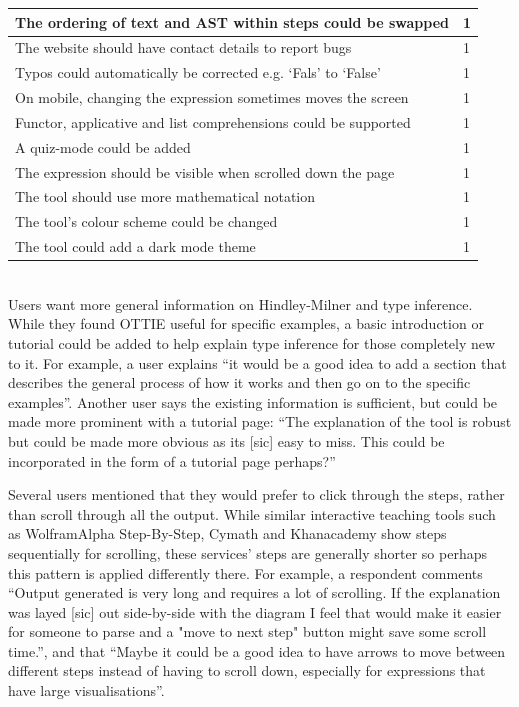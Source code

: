 \documentclass[a4paper,fleqn,oneside,12pt]{report}
\begin{document}
\begin{adjustbox}{center}
\begin{tabularx}{\textwidth}{ |X|p{1.5cm}| }
    \hline
    The ordering of text and AST within steps could be swapped & 1 \\
    \hline
    The website should have contact details to report bugs & 1 \\
    \hline
    Typos could automatically be corrected e.g. `Fals' to `False' & 1 \\
    \hline
    On mobile, changing the expression sometimes moves the screen & 1 \\
    \hline
    Functor, applicative and list comprehensions could be supported & 1 \\
    \hline
    A quiz-mode could be added & 1 \\
    \hline
    The expression should be visible when scrolled down the page & 1 \\
    \hline
    The tool should use more mathematical notation & 1 \\
    \hline
    The tool's colour scheme could be changed & 1 \\
    \hline
    The tool could add a dark mode theme & 1 \\
    \hline
  \end{tabularx}
\end{adjustbox}\\

Users want more general information on Hindley-Milner and type inference. While they found OTTIE useful for specific examples, a basic introduction or tutorial could be added to help explain type inference for those completely new to it. For example, a user explains “it would be a good idea to add a section that describes the general process of how it works and then go on to the specific examples”. Another user says the existing information is sufficient, but could be made more prominent with a tutorial page: “The explanation of the tool is robust but could be made more obvious as its [sic] easy to miss. This could be incorporated in the form of a tutorial page perhaps?”

Several users mentioned that they would prefer to click through the steps, rather than scroll through all the output. While similar interactive teaching tools such as WolframAlpha Step-By-Step, Cymath and Khanacademy show steps sequentially for scrolling, these services’ steps are generally shorter so perhaps this pattern is applied differently there. For example, a respondent comments “Output generated is very long and requires a lot of scrolling. If the explanation was layed [sic] out side-by-side with the diagram I feel that would make it easier for someone to parse and a "move to next step" button might save some scroll time.”, and that “Maybe it could be a good idea to have arrows to move between different steps instead of having to scroll down, especially for expressions that have large visualisations”.
\end{document}
